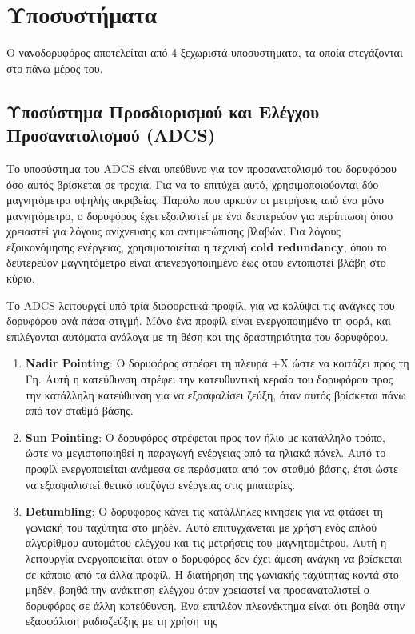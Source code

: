 \documentclass[a4paper,nobib,justified]{tufte-book}
\begin{document}
\section{Υποσυστήματα}
Ο νανοδορυφόρος αποτελείται από 4 ξεχωριστά υποσυστήματα, τα οποία στεγάζονται στο πάνω μέρος του.
\subsection{Υποσύστημα Προσδιορισμού και Ελέγχου Προσανατολισμού (\acs{ADCS})}
Το υποσύστημα του \acs{ADCS} είναι υπεύθυνο για τον προσανατολισμό του δορυφόρου όσο αυτός βρίσκεται σε τροχιά. Για να το επιτύχει αυτό, χρησιμοποιούονται δύο μαγνητόμετρα υψηλής ακριβείας. Παρόλο που αρκούν οι μετρήσεις από ένα μόνο μανγητόμετρο, ο δορυφόρος έχει εξοπλιστεί με ένα δευτερεύον για περίπτωση όπου χρειαστεί για λόγους ανίχνευσης και αντιμετώπισης βλαβών. Για λόγους εξοικονόμησης ενέργειας, χρησιμοποιείται η τεχνική \textbf{cold redundancy}, όπου το δευτερεύον μαγνητόμετρο είναι απενεργοποιημένο έως ότου εντοπιστεί βλάβη στο κύριο.

Το \acs{ADCS} λειτουργεί υπό τρία διαφορετικά προφίλ, για να καλύψει τις ανάγκες του δορυφόρου ανά πάσα στιγμή. Μόνο ένα προφίλ είναι ενεργοποιημένο τη φορά, και επιλέγονται αυτόματα ανάλογα με τη θέση και της δραστηριότητα του δορυφόρου.
\begin{enumerate}
    \item \textbf{Nadir Pointing}: Ο δορυφόρος στρέφει τη πλευρά +X ώστε να κοιτάζει προς τη Γη. Αυτή η κατεύθυνση στρέφει την κατευθυντική κεραία του δορυφόρου προς την κατάλληλη κατεύθυνση για να εξασφαλίσει ζεύξη, όταν αυτός βρίσκεται πάνω από τον σταθμό βάσης. 
    \item \textbf{Sun Pointing}: Ο δορυφόρος στρέφεται προς τον ήλιο με κατάλληλο τρόπο, ώστε να μεγιστοποιηθεί η παραγωγή ενέργειας από τα ηλιακά πάνελ. Αυτό το προφίλ ενεργοποιείται ανάμεσα σε περάσματα από τον σταθμό βάσης, έτσι ώστε να εξασφαλιστεί θετικό ισοζύγιο ενέργειας στις μπαταρίες.
    \item \textbf{Detumbling}: Ο δορυφόρος κάνει τις κατάλληλες κινήσεις για να φτάσει τη γωνιακή του ταχύτητα στο μηδέν. Αυτό επιτυγχάνεται με χρήση ενός απλού αλγορίθμου αυτομάτου ελέγχου και τις μετρήσεις του μαγνητομέτρου. Αυτή η λειτουργία ενεργοποιείται όταν ο δορυφόρος δεν έχει άμεση ανάγκη να βρίσκεται σε κάποιο από τα άλλα προφίλ. Η διατήρηση της γωνιακής ταχύτητας κοντά στο μηδέν, βοηθά την ανάκτηση ελέγχου όταν χρειαστεί να προσανατολιστεί ο δορυφόρος σε άλλη κατεύθυνση. Ένα επιπλέον πλεονέκτημα είναι ότι βοηθά στην εξασφάλιση ραδιοζεύξης με τη χρήση της %
\end{enumerate}
\end{document}
